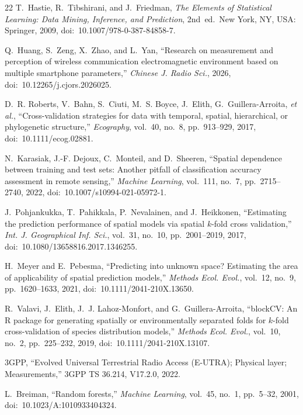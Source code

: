 \documentclass{ieeeaccess}
\begin{document}
\begin{thebibliography}{22}
T.~Hastie, R.~Tibshirani, and J.~Friedman, \emph{The Elements of Statistical
Learning: Data Mining, Inference, and Prediction}, 2nd~ed.\ New York, NY, USA:
Springer, 2009, doi:~10.1007/978-0-387-84858-7.

Q.~Huang, S.~Zeng, X.~Zhao, and L.~Yan, ``Research on measurement and perception
of wireless communication electromagnetic environment based on multiple smartphone
parameters,'' \emph{Chinese J. Radio Sci.}, 2026,
doi:~10.12265/j.cjors.2026025.

D.~R. Roberts, V.~Bahn, S.~Ciuti, M.~S. Boyce, J.~Elith, G.~Guillera-Arroita,
\emph{et al.}, ``Cross-validation strategies for data with temporal, spatial,
hierarchical, or phylogenetic structure,'' \emph{Ecography}, vol.~40, no.~8,
pp.~913--929, 2017, doi:~10.1111/ecog.02881.

N.~Karasiak, J.-F. Dejoux, C.~Monteil, and D.~Sheeren, ``Spatial dependence
between training and test sets: Another pitfall of classification accuracy
assessment in remote sensing,'' \emph{Machine Learning}, vol.~111, no.~7,
pp.~2715--2740, 2022, doi:~10.1007/s10994-021-05972-1.

J.~Pohjankukka, T.~Pahikkala, P.~Nevalainen, and J.~Heikkonen, ``Estimating the
prediction performance of spatial models via spatial $k$-fold cross
validation,'' \emph{Int. J. Geographical Inf. Sci.}, vol.~31, no.~10,
pp.~2001--2019, 2017, doi:~10.1080/13658816.2017.1346255.

H.~Meyer and E.~Pebesma, ``Predicting into unknown space? Estimating the area
of applicability of spatial prediction models,'' \emph{Methods Ecol. Evol.},
vol.~12, no.~9, pp.~1620--1633, 2021, doi:~10.1111/2041-210X.13650.

R.~Valavi, J.~Elith, J.~J. Lahoz-Monfort, and G.~Guillera-Arroita, ``blockCV: An
R package for generating spatially or environmentally separated folds for
$k$-fold cross-validation of species distribution models,''
\emph{Methods Ecol. Evol.}, vol.~10, no.~2, pp.~225--232, 2019,
doi:~10.1111/2041-210X.13107.

3GPP, ``Evolved Universal Terrestrial Radio Access (E-UTRA); Physical
layer; Measurements,'' 3GPP TS 36.214, V17.2.0, 2022.

L.~Breiman, ``Random forests,'' \emph{Machine Learning}, vol.~45, no.~1,
pp.~5--32, 2001, doi:~10.1023/A:1010933404324.


\end{thebibliography}
\end{document}
